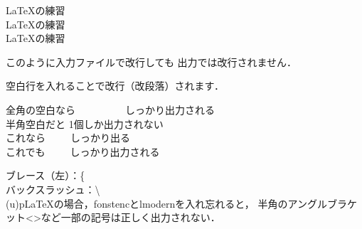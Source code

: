 \documentclass[lualatex]{jlreq}
\begin{document}
	\LaTeX の練習\\  %
	{\LaTeX}の練習\\ %
	\LaTeX{}の練習\\ %


	このように入力ファイルで改行しても
	出力では改行されません．

	空白行を入れることで改行（改段落）されます．

	全角の空白なら　　　　　しっかり出力される\\
	半角空白だと     1個しか出力されない\\
	これなら\ \ \ \ \ しっかり出る\\
	これでも~~~~~しっかり出力される

	ブレース（左）：\{ \\
	バックスラッシュ：\textbackslash \\
	(u)pLaTeXの場合，fonstencとlmodernを入れ忘れると，
	半角のアングルブラケット<>など一部の記号は正しく出力されない．

\end{document}
